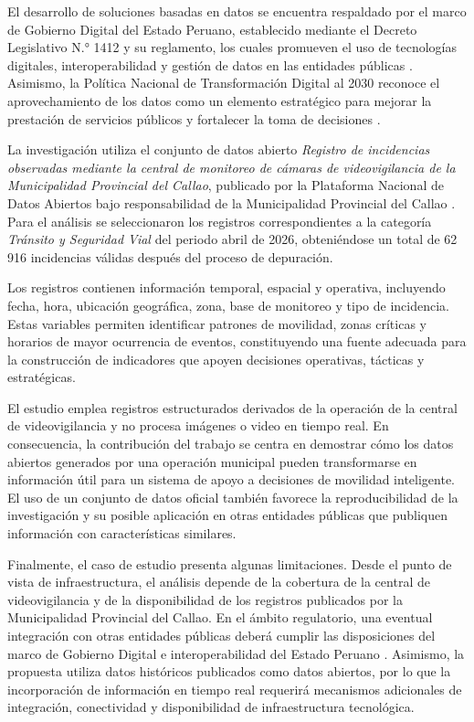 \documentclass[]{IEEEphot}
\begin{document}
El desarrollo de soluciones basadas en datos se encuentra respaldado por el marco de Gobierno Digital del Estado Peruano, establecido mediante el Decreto Legislativo N.° 1412 y su reglamento, los cuales promueven el uso de tecnologías digitales, interoperabilidad y gestión de datos en las entidades públicas \cite{pcm2018gobiernodigital,pcm2021reglamentogd}. Asimismo, la Política Nacional de Transformación Digital al 2030 reconoce el aprovechamiento de los datos como un elemento estratégico para mejorar la prestación de servicios públicos y fortalecer la toma de decisiones \cite{pcm2023transformaciondigital}.

La investigación utiliza el conjunto de datos abierto \textit{Registro de incidencias observadas mediante la central de monitoreo de cámaras de videovigilancia de la Municipalidad Provincial del Callao}, publicado por la Plataforma Nacional de Datos Abiertos bajo responsabilidad de la Municipalidad Provincial del Callao \cite{CallaoIncidencias2026}. Para el análisis se seleccionaron los registros correspondientes a la categoría \textit{Tránsito y Seguridad Vial} del periodo abril de 2026, obteniéndose un total de 62\,916 incidencias válidas después del proceso de depuración.

Los registros contienen información temporal, espacial y operativa, incluyendo fecha, hora, ubicación geográfica, zona, base de monitoreo y tipo de incidencia. Estas variables permiten identificar patrones de movilidad, zonas críticas y horarios de mayor ocurrencia de eventos, constituyendo una fuente adecuada para la construcción de indicadores que apoyen decisiones operativas, tácticas y estratégicas.


El estudio emplea registros estructurados derivados de la operación de la central de videovigilancia y no procesa imágenes o video en tiempo real. En consecuencia, la contribución del trabajo se centra en demostrar cómo los datos abiertos generados por una operación municipal pueden transformarse en información útil para un sistema de apoyo a decisiones de movilidad inteligente. El uso de un conjunto de datos oficial también favorece la reproducibilidad de la investigación y su posible aplicación en otras entidades públicas que publiquen información con características similares.

Finalmente, el caso de estudio presenta algunas limitaciones. Desde el punto de vista de infraestructura, el análisis depende de la cobertura de la central de videovigilancia y de la disponibilidad de los registros publicados por la Municipalidad Provincial del Callao. En el ámbito regulatorio, una eventual integración con otras entidades públicas deberá cumplir las disposiciones del marco de Gobierno Digital e interoperabilidad del Estado Peruano \cite{pcm2018gobiernodigital,pcm2021reglamentogd,pcm2011pide}. Asimismo, la propuesta utiliza datos históricos publicados como datos abiertos, por lo que la incorporación de información en tiempo real requerirá mecanismos adicionales de integración, conectividad y disponibilidad de infraestructura tecnológica.
\end{document}
